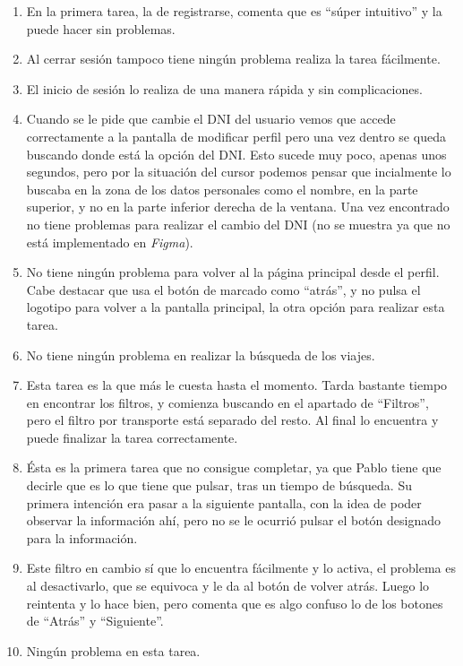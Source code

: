\begin{enumerate}
    \item En la primera tarea, la de registrarse, comenta que es ``súper intuitivo'' y la puede hacer sin problemas.
    \item Al cerrar sesión tampoco tiene ningún problema realiza la tarea fácilmente.
    \item El inicio de sesión lo realiza de una manera rápida y sin complicaciones.
    \item Cuando se le pide que cambie el DNI del usuario vemos que accede correctamente a la pantalla de modificar perfil
        pero una vez dentro se queda buscando donde está la opción del DNI. Esto sucede muy poco, apenas unos segundos, pero
        por la situación del cursor podemos pensar que incialmente lo buscaba en la zona de los datos personales como el nombre, en la
        parte superior, y no en la parte inferior derecha de la ventana. Una vez encontrado no tiene problemas para realizar el cambio
        del DNI (no se muestra ya que no está implementado en \textit{Figma}).
    \item No tiene ningún problema para volver al la página principal desde el perfil. Cabe destacar que usa el botón de marcado
        como ``atrás'', y no pulsa el logotipo para volver a la pantalla principal, la otra opción para realizar esta tarea.
    \item No tiene ningún problema en realizar la búsqueda de los viajes.
    \item Esta tarea es la que más le cuesta hasta el momento. Tarda bastante tiempo en encontrar los filtros, y comienza buscando
        en el apartado de ``Filtros'', pero el filtro por transporte está separado del resto. Al final lo encuentra y puede finalizar la
        tarea correctamente.
    \item Ésta es la primera tarea que no consigue completar, ya que Pablo tiene que decirle que es lo que tiene que pulsar, tras un tiempo
        de búsqueda. Su primera intención era pasar a la siguiente pantalla, con la idea de poder observar la información ahí, pero no se le
        ocurrió pulsar el botón designado para la información.
    \item Este filtro en cambio sí que lo encuentra fácilmente y lo activa, el problema es al desactivarlo, que se equivoca y le da al botón de
        volver atrás. Luego lo reintenta y lo hace bien, pero comenta que es algo confuso lo de los botones de ``Atrás'' y ``Siguiente''.
    \item Ningún problema en esta tarea.

\end{enumerate}
